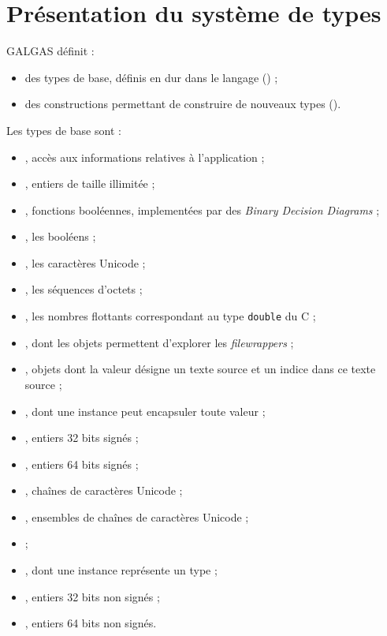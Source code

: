 
\chapter{Présentation du système de types}



GALGAS définit :
\begin{itemize}
\item des types de base, définis en dur dans le langage () ;
\item des constructions permettant de construire de nouveaux types ().
\end{itemize}





Les types de base sont :
\begin{itemize}
\item {}, accès aux informations relatives à l'application ;
\item {}, entiers de taille illimitée ;
\item {}, fonctions booléennes, implementées par des \emph{Binary Decision Diagrams} ;
\item {}, les booléens ;
\item {}, les caractères Unicode ;
\item {}, les séquences d'octets ;
\item {}, les nombres flottants correspondant au type \texttt{double} du C ;
\item {}, dont les objets permettent d'explorer les \emph{filewrappers} ;
\item {}, objets dont la valeur désigne un texte source et un indice dans ce texte source ;
\item {}, dont une instance peut encapsuler toute valeur ;
\item {}, entiers 32 bits signés ;
\item {}, entiers 64 bits signés ;
\item {}, chaînes de caractères Unicode ;
\item {}, ensembles de chaînes de caractères Unicode ;
\item {} ;
\item {}, dont une instance représente un type ;
\item {}, entiers 32 bits non signés ;
\item {}, entiers 64 bits non signés.
\end{itemize}





